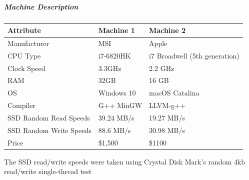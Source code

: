 \documentclass[
]{article}
\begin{document}
\hypertarget{machine-description}{%
\subparagraph{Machine Description}\label{machine-description}}

\begin{longtable}[]{@{}lll@{}}
\toprule
Attribute & Machine 1 & Machine 2\tabularnewline
\midrule
\endhead
Manufacturer & MSI & Apple\tabularnewline
CPU Type & i7-6820HK & i7 Broadwell (5th generation)\tabularnewline
Clock Speed & 3.3GHz & 2.2 GHz\tabularnewline
RAM & 32GB & 16 GB\tabularnewline
OS & Windows 10 & macOS Catalina\tabularnewline
Compiler & G++ MinGW & LLVM-g++\tabularnewline
SSD Random Read Speeds & 39.24 MB/s & 19.27 MB/s\tabularnewline
SSD Random Write Speeds & 88.6 MB/s & 30.98 MB/s\tabularnewline
Price & \$1,500 & \$1100\tabularnewline
\bottomrule
\end{longtable}

The SSD read/write speeds were taken using Crystal Disk Mark's random
4kb read/write single-thread test
\end{document}
